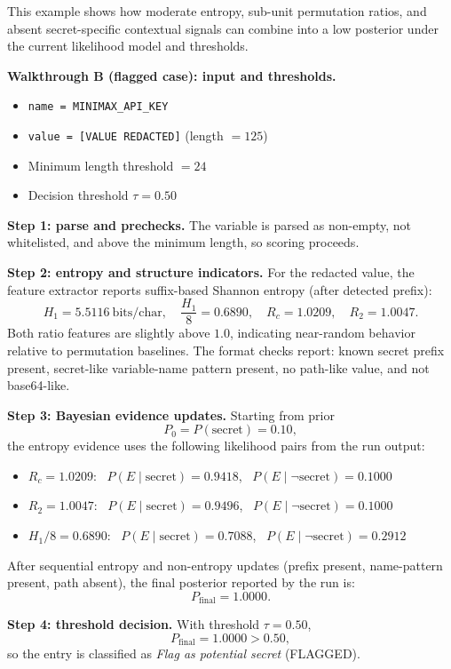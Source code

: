 \documentclass[10pt]{article}
\begin{document}
This example shows how moderate entropy, sub-unit permutation ratios, and absent secret-specific contextual signals can combine into a low posterior under the current likelihood model and thresholds.

\textbf{Walkthrough B (flagged case): input and thresholds.}
\begin{itemize}
  \item \texttt{name = MINIMAX\_API\_KEY}
  \item \texttt{value = [VALUE REDACTED]} (length $=125$)
  \item Minimum length threshold $=24$
  \item Decision threshold $\tau=0.50$
\end{itemize}

\textbf{Step 1: parse and prechecks.}
The variable is parsed as non-empty, not whitelisted, and above the minimum length, so scoring proceeds.

\textbf{Step 2: entropy and structure indicators.}
For the redacted value, the feature extractor reports suffix-based Shannon entropy (after detected prefix):
\[
H_1=5.5116\ \text{bits/char},\quad \frac{H_1}{8}=0.6890,\quad R_c=1.0209,\quad R_2=1.0047.
\]
Both ratio features are slightly above $1.0$, indicating near-random behavior relative to permutation baselines. The format checks report: known secret prefix present, secret-like variable-name pattern present, no path-like value, and not base64-like.

\textbf{Step 3: Bayesian evidence updates.}
Starting from prior
\[
P_0=P(\text{secret})=0.10,
\]
the entropy evidence uses the following likelihood pairs from the run output:
\begin{itemize}
  \item $R_c=1.0209$: \ $P(E\mid\text{secret})=0.9418$, \ $P(E\mid\neg\text{secret})=0.1000$
  \item $R_2=1.0047$: \ $P(E\mid\text{secret})=0.9496$, \ $P(E\mid\neg\text{secret})=0.1000$
  \item $H_1/8=0.6890$: \ $P(E\mid\text{secret})=0.7088$, \ $P(E\mid\neg\text{secret})=0.2912$
\end{itemize}
After sequential entropy and non-entropy updates (prefix present, name-pattern present, path absent), the final posterior reported by the run is:
\[
P_{\mathrm{final}}=1.0000.
\]

\textbf{Step 4: threshold decision.}
With threshold $\tau=0.50$,
\[
P_{\mathrm{final}}=1.0000>0.50,
\]
so the entry is classified as \emph{Flag as potential secret} (FLAGGED).
\end{document}
